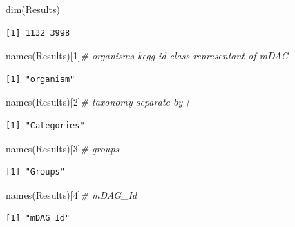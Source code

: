 \documentclass[
  letterpaper,
  DIV=11,
  numbers=noendperiod]{scrreprt}
\newenvironment{Shaded}{}{}
\newcommand{\CommentTok}[1]{\textcolor[rgb]{0.36,0.39,0.44}{\textit{#1}}}
\newcommand{\DecValTok}[1]{\textcolor[rgb]{0.82,0.60,0.40}{#1}}
\newcommand{\FunctionTok}[1]{\textcolor[rgb]{0.38,0.69,0.94}{#1}}
\newcommand{\NormalTok}[1]{\textcolor[rgb]{0.67,0.70,0.75}{#1}}
\begin{document}
\begin{Shaded}
\begin{Highlighting}[]
\FunctionTok{dim}\NormalTok{(Results)}
\end{Highlighting}
\end{Shaded}

\begin{verbatim}
[1] 1132 3998
\end{verbatim}

\begin{Shaded}
\begin{Highlighting}[]
\FunctionTok{names}\NormalTok{(Results)[}\DecValTok{1}\NormalTok{]}\CommentTok{\# organisms  kegg id  class representant of mDAG}
\end{Highlighting}
\end{Shaded}

\begin{verbatim}
[1] "organism"
\end{verbatim}

\begin{Shaded}
\begin{Highlighting}[]
\FunctionTok{names}\NormalTok{(Results)[}\DecValTok{2}\NormalTok{]}\CommentTok{\# taxonomy separate by |}
\end{Highlighting}
\end{Shaded}

\begin{verbatim}
[1] "Categories"
\end{verbatim}

\begin{Shaded}
\begin{Highlighting}[]
\FunctionTok{names}\NormalTok{(Results)[}\DecValTok{3}\NormalTok{]}\CommentTok{\# groups }
\end{Highlighting}
\end{Shaded}

\begin{verbatim}
[1] "Groups"
\end{verbatim}

\begin{Shaded}
\begin{Highlighting}[]
\FunctionTok{names}\NormalTok{(Results)[}\DecValTok{4}\NormalTok{]}\CommentTok{\# mDAG\_Id }
\end{Highlighting}
\end{Shaded}

\begin{verbatim}
[1] "mDAG Id"
\end{verbatim}
\end{document}
